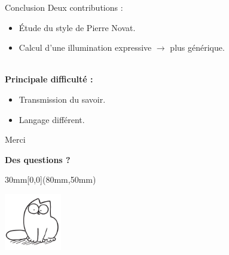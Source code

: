 \documentclass{beamer}
\begin{document}
\begin{frame}{Conclusion}
Deux contributions : 
\begin{itemize}
\item Étude du style de Pierre Novat.
\item Calcul d'une illumination expressive $\rightarrow$ plus générique. 
\end{itemize}
~\\
\textbf{Principale difficulté :} 
\begin{itemize}
\item Transmission du savoir.
\item Langage différent. 
\end{itemize}


    


\end{frame}

\begin{frame}{Merci}
\begin{center}
\textbf{Des questions ?} 
\end{center}

\begin{textblock*}{30mm}[0,0](80mm,50mm)

\includegraphics[width=25mm]{Images/simon.jpg}

\end{textblock*}
\end{frame}
\end{document}
